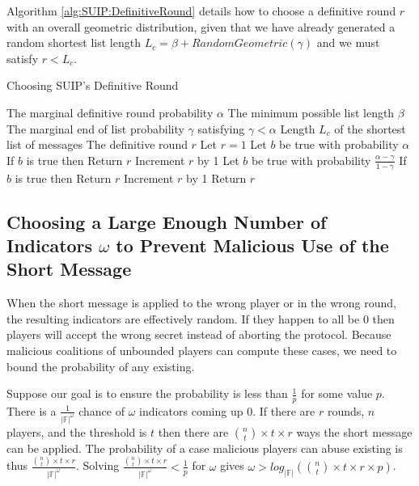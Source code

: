 \documentclass{dalcsthesis}
\begin{document}
Algorithm \ref{alg:SUIP:DefinitiveRound} details how to choose a definitive round $r$ with an overall geometric distribution, given that we have already generated a random shortest list length $L_c = \beta + RandomGeometric(\gamma)$ and we must satisfy $r < L_c$.

\begin{algorithm}
  \caption{Choosing SUIP's Definitive Round}
  \label{alg:SUIP:DefinitiveRound}
  \begin{algorithmic}
    \INPUT The marginal definitive round probability $\alpha$ 
    \INPUT The minimum possible list length $\beta$
    \INPUT The marginal end of list probability $\gamma$ satisfying $\gamma < \alpha$
    \INPUT Length $L_c$ of the shortest list of messages
    \OUTPUT The definitive round $r$
    \STATE Let $r = 1$
      \STATE Let $b$ be true with probability $\alpha$
      \STATE If $b$ is true then Return $r$
      \STATE Increment $r$ by 1 
    \ENDWHILE
      \STATE Let $b$ be true with probability $\frac{\alpha - \gamma}{1 - \gamma}$
      \STATE If $b$ is true then Return $r$
      \STATE Increment $r$ by 1
    \ENDWHILE
    \STATE Return $r$
  \end{algorithmic}
\end{algorithm}

\subsection{Choosing a Large Enough Number of Indicators $\omega$ to Prevent Malicious Use of the Short Message}
\label{Sec:SUIP:MinIndicators}

When the short message is applied to the wrong player or in the wrong round, the resulting indicators are effectively random. If they happen to all be 0 then players will accept the wrong secret instead of aborting the protocol. Because malicious coalitions of unbounded players can compute these cases, we need to bound the probability of any existing.

Suppose our goal is to ensure the probability is less than $\frac{1}{p}$ for some value $p$. There is a $\frac{1}{|\mathbb{F}|^\omega}$ chance of $\omega$ indicators coming up 0. If there are $r$ rounds, $n$ players, and the threshold is $t$ then there are $\binom{n}{t} \times t \times r$ ways the short message can be applied. The probability of a case malicious players can abuse existing is thus $\frac{\binom{n}{t} \times t \times r}{|\mathbb{F}|^\omega}$. Solving $\frac{\binom{n}{t} \times t \times r}{|\mathbb{F}|^\omega} < \frac{1}{p}$ for $\omega$ gives $\omega > log_{|\mathbb{F}|} (\binom{n}{t} \times t \times r \times p)$.
\end{document}

